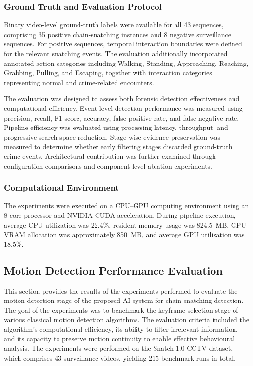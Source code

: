 \documentclass[runningheads]{llncs}
\begin{document}
\subsubsection{Ground Truth and Evaluation Protocol}

Binary video-level ground-truth labels were available for all 43
sequences, comprising 35 positive chain-snatching instances and 8
negative surveillance sequences. For positive sequences, temporal
interaction boundaries were defined for the relevant snatching events.
The evaluation additionally incorporated annotated action categories
including Walking, Standing, Approaching, Reaching, Grabbing, Pulling,
and Escaping, together with interaction categories representing normal
and crime-related encounters.

The evaluation was designed to assess both forensic detection
effectiveness and computational efficiency. Event-level detection
performance was measured using precision, recall, F1-score, accuracy,
false-positive rate, and false-negative rate. Pipeline efficiency was
evaluated using processing latency, throughput, and progressive
search-space reduction. Stage-wise evidence preservation was measured
to determine whether early filtering stages discarded ground-truth
crime events. Architectural contribution was further examined through
configuration comparisons and component-level ablation experiments.

\subsubsection{Computational Environment}

The experiments were executed on a CPU--GPU computing environment using
an 8-core processor and NVIDIA CUDA acceleration. During pipeline
execution, average CPU utilization was 22.4\%, resident memory usage
was 824.5~MB, GPU VRAM allocation was approximately 850~MB, and average
GPU utilization was 18.5\%.

\subsection{Motion Detection Performance Evaluation}
This section provides the results of the experiments performed to evaluate the motion detection stage of the proposed AI system for chain-snatching detection. The goal of the experiments was to benchmark the keyframe selection stage of various classical motion detection algorithms. The evaluation criteria included the algorithm’s computational efficiency, its ability to filter irrelevant information, and its capacity to preserve motion continuity to enable effective behavioural analysis. The experiments were performed on the Snatch 1.0 CCTV dataset, which comprises 43 surveillance videos, yielding 215 benchmark runs in total.
\end{document}

